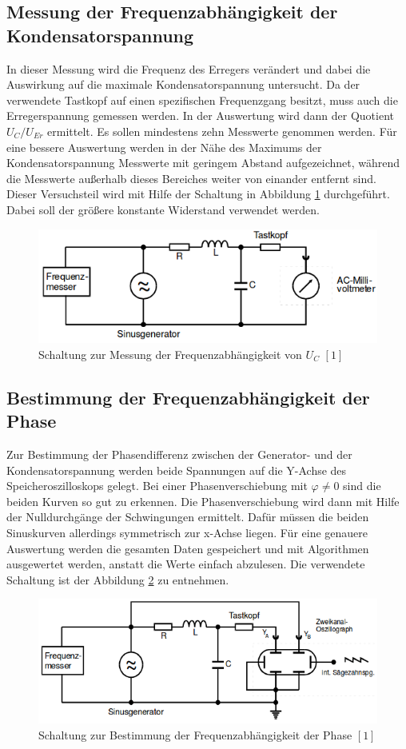 \documentclass[11pt,ngerman,a4paper]{article}
\begin{document}
\subsection{Messung der Frequenzabhängigkeit der Kondensatorspannung}
In dieser Messung wird die Frequenz des Erregers verändert und dabei die Auswirkung auf die maximale Kondensatorspannung untersucht. Da der verwendete Tastkopf auf einen spezifischen Frequenzgang besitzt, muss auch die Erregerspannung gemessen werden. In der Auswertung wird dann der Quotient $U_C / U_{Er}$ ermittelt.
Es sollen mindestens zehn Messwerte genommen werden. Für eine bessere Auswertung werden in der Nähe des Maximums der Kondensatorspannung Messwerte mit geringem Abstand aufgezeichnet, während die Messwerte außerhalb dieses Bereiches weiter von einander entfernt sind.
Dieser Versuchsteil wird mit Hilfe der Schaltung in Abbildung \ref{S2} durchgeführt. Dabei soll der größere konstante Widerstand verwendet werden.
\begin{figure}[h]
\centering
\includegraphics[scale=0.7]{Aufbau2.png}
\caption{Schaltung zur Messung der Frequenzabhängigkeit von $U_C$ $[1]$}
\label{S2}
\end{figure}
\subsection{Bestimmung der Frequenzabhängigkeit der Phase}
Zur Bestimmung der Phasendifferenz zwischen der Generator- und der Kondensatorspannung werden beide Spannungen auf die Y-Achse des Speicheroszilloskops gelegt. Bei einer Phasenverschiebung mit $\varphi \neq 0$ sind die beiden Kurven so gut zu erkennen. Die Phasenverschiebung wird dann mit Hilfe der Nulldurchgänge der Schwingungen ermittelt. Dafür müssen die beiden Sinuskurven allerdings symmetrisch zur x-Achse liegen. Für eine genauere Auswertung werden die gesamten Daten gespeichert und mit Algorithmen ausgewertet werden, anstatt die Werte einfach abzulesen. Die verwendete Schaltung ist der Abbildung \ref{S3} zu entnehmen.
\begin{figure}[h]
\centering
\includegraphics[scale=0.7]{Aufbau3.png}
\caption{Schaltung zur Bestimmung der Frequenzabhängigkeit der Phase $[1]$}
\label{S3}
\end{figure}
\end{document}
